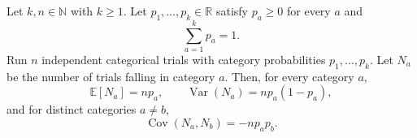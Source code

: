 \begin{theorem}
Let $k,n\in\mathbb{N}$ with $k\ge 1$. Let
$p_1,\ldots,p_k\in\mathbb{R}$ satisfy $p_a\ge 0$ for every $a$ and
\[
\sum_{a=1}^k p_a=1.
\]
Run $n$ independent categorical trials with category probabilities
$p_1,\ldots,p_k$. Let $N_a$ be the number of trials falling in category $a$.
Then, for every category $a$,
\[
\mathbb E[N_a]=np_a,
\qquad
\operatorname{Var}(N_a)=np_a(1-p_a),
\]
and for distinct categories $a\ne b$,
\[
\operatorname{Cov}(N_a,N_b)=-np_ap_b.
\]
\end{theorem}
